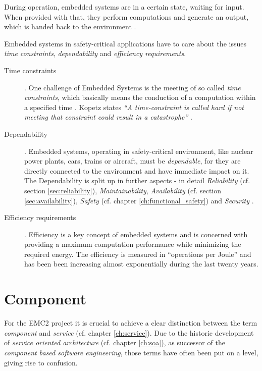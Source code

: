 During operation, embedded systems are in a certain state, waiting for input. When provided with that, they perform computations and generate an output, which is handed back to the environment \cite[p.9]{marwedel}.

Embedded systems in safety-critical applications have to care about the issues \emph{time constraints}, \emph{dependability} and \emph{efficiency requirements}.

\begin{description}
	\item [Time constraints].
	One challenge of Embedded Systems is the meeting of so called \emph{time constraints}, which basically means the conduction of a computation within a specified time \cite[p.8-9]{marwedel} \cite{rodrigues2011}. Kopetz states \emph{``A time-constraint is called hard if not meeting that constraint could result in a catastrophe''} \cite{kopetz}.
	\item [Dependability].
	Embedded systems, operating in safety-critical environment, like nuclear power plants, cars, trains or aircraft, must be \emph{dependable}, for they are directly connected to the environment and have immediate impact on it. The Dependability is split up in further aspects - in detail \emph{Reliability} (cf. section \ref{sec:reliability}), \emph{Maintainability}, \emph{Availability} (cf. section \ref{sec:availability}), \emph{Safety} (cf. chapter \ref{ch:functional_safety}) and \emph{Security} \cite[p.4-5]{marwedel}.
	\item [Efficiency requirements].
	Efficiency is a key concept of embedded systems and is concerned with providing a maximum computation performance while minimizing the required energy. The efficiency is measured in ``operations per Joule'' and has been been increasing almost exponentially during the last twenty years.
\end{description}






\section{Component}

\label{ch:component}

For the EMC2 project it is crucial to achieve a clear distinction between the term \emph{component} and \emph{service} (cf. chapter \ref{ch:service}). Due to the historic development of \emph{service oriented architecture} (cf. chapter \ref{ch:soa}), as successor of the \emph{component based software engineering}, those terms have often been put on a level, giving rise to confusion. 

